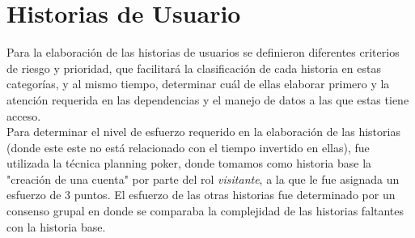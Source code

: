 \documentclass[a4paper,12 pt]{article}
\begin{document}
\section{Historias de Usuario}

Para la elaboración de las historias de usuarios se definieron diferentes
criterios de riesgo y prioridad, que facilitará la clasificación de cada
historia en estas categorías, y al mismo tiempo, determinar cuál de ellas
elaborar primero y la atención requerida en las dependencias y el manejo de
datos a las que estas tiene acceso.\\

Para determinar el nivel de esfuerzo requerido en la elaboración de las
historias (donde este este no está relacionado con el tiempo invertido en
ellas), fue utilizada la técnica planning poker, donde tomamos como historia
base la "creación de una cuenta" por parte del rol \textit{visitante}, a la que
le fue asignada un esfuerzo de 3 puntos. El esfuerzo de las otras historias fue
determinado por un consenso grupal en donde se comparaba la complejidad de las
historias faltantes con la historia base.\\
\end{document}
